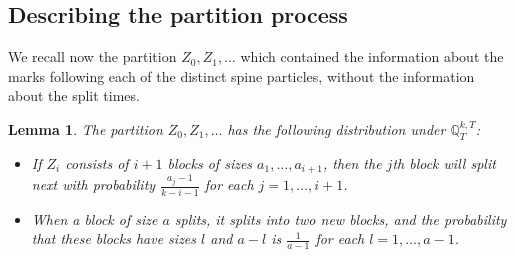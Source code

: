 \documentclass{article}
\theoremstyle{plain}
\newtheorem{lem}[thm]{Lemma}
\theoremstyle{definition}
\newcommand{\Q}{\mathbb{Q}}
\begin{document}
\subsection{Describing the partition process}

We recall now the partition $Z_0,Z_1,\ldots$ which contained the information about the marks following each of the distinct spine particles, without the information about the split times.

\begin{lem}\label{QtopologyBD}
The partition $Z_0,Z_1,\ldots$ has the following distribution under $\Q^{k,T}_T$:
\begin{itemize}
\item If $Z_i$ consists of $i+1$ blocks of sizes $a_1,\ldots,a_{i+1}$, then the $j$th block will split next with probability $\frac{a_j-1}{k-i-1}$ for each $j=1,\ldots,i+1$.
\item When a block of size $a$ splits, it splits into two new blocks, and the probability that these blocks have sizes $l$ and $a-l$ is $\frac{1}{a-1}$ for each $l=1,\ldots,a-1$.
\end{itemize}
\end{lem}
\end{document}
